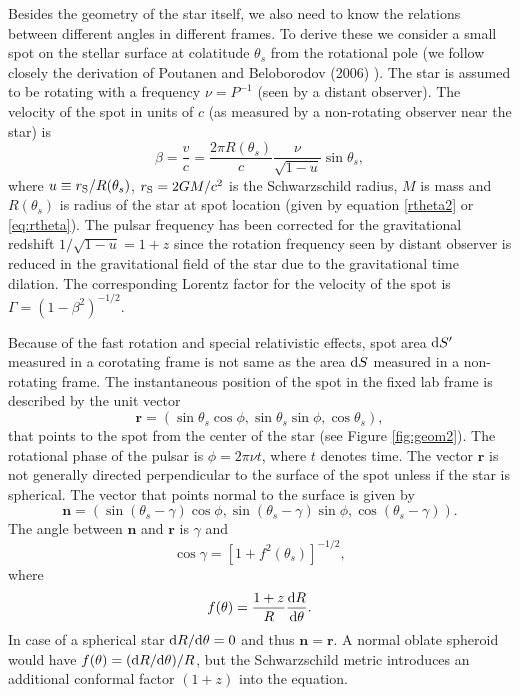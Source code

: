 \documentclass{wihuri}
\def\rg{r_{\rm S}} %
\def\be{\begin{equation}}
\def\ee{\end{equation}}
\def\d{{\rm d}}
\def\rg{r_{\rm S}} %
\def\thetas{\theta_{s}}
\newcommand{\bmath}[1]{\boldsymbol{#1}}
\begin{document}
Besides the geometry of the star itself, we also need to know the relations between different angles in different frames. To derive these we consider a small spot on the stellar surface at colatitude $\thetas$ from the rotational pole (we follow closely the derivation of Poutanen and Beloborodov (2006) \cite{poutabelo}). 
The star is assumed to be rotating  with a frequency $\nu=P^{-1}$ (seen by a distant observer).
The velocity of the spot in units of $c$ (as measured by a non-rotating observer near the star)  %
is 
\begin{equation}
\label{beta2}
\beta = \frac{v}{c}=\frac{2\pi R(\thetas)}{c} \frac{\nu}{\sqrt{1-u}} \sin\thetas, 
\end{equation}
where %
$u\equiv\rg/R(\thetas)$, 
$\rg=2GM/c^2$ is the Schwarzschild radius, $M$ is mass and $R(\thetas)$ is
radius of the star at spot location (given by equation \ref{rtheta2} or \ref{eq:rtheta}). The pulsar frequency has been corrected for the gravitational redshift $1/\sqrt{1-u}=1+z$ since the rotation frequency seen by distant observer is reduced in the gravitational field of the star due to the gravitational time dilation. The corresponding Lorentz factor for the velocity of the spot is $\Gamma=(1-\beta^2)^{-1/2}$.

Because of the fast rotation and special relativistic effects, spot area $\d S^\prime$ measured in a corotating frame is not same as the area $\d S$ measured in a non-rotating frame. The instantaneous position of the spot in the fixed lab frame is described by the unit vector 
\begin{equation}
\bmath{r}=(\sin\thetas\cos\phi, \sin\thetas\sin\phi, \cos\thetas),
\end{equation}
that points to the spot from the center of the star (see Figure \ref{fig:geom2}). The rotational phase of the pulsar is $\phi=2\pi\nu t$, where $t$ denotes time. The vector $\bmath{r}$ is not generally directed perpendicular to the surface of the spot unless if the star is spherical. The vector that points normal to the surface is given by
\begin{equation}
\bmath{n}=(\sin(\thetas-\gamma)\cos\phi, \sin(\thetas-\gamma)\sin\phi, \cos(\thetas-\gamma)).
\end{equation}
The angle between $\bmath{n}$ and $\bmath{r}$ is $\gamma$ and 
\begin{equation}
\cos\gamma=[1+f^{2}(\thetas)]^{-1/2},
\end{equation}
where
\be \label{eq:ftheta}
f(\theta)=\frac{1+z}{R}\frac{\d R}{\d \theta}.
\ee
In case of a spherical star $\d R / \d \theta = 0$ and thus $\bmath{n} = \bmath{r}$. A normal oblate spheroid would have $f(\theta)=(\d R /\d \theta)/R$, but the Schwarzschild metric introduces an additional conformal factor $(1+z)$ into the equation. 
\end{document}
